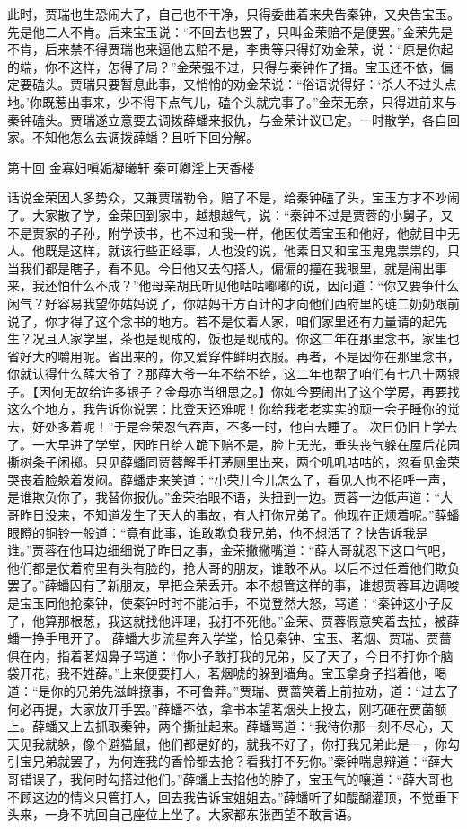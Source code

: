 \documentclass[12pt,oneside]{book}
\begin{document}
此时，贾瑞也生恐闹大了，自己也不干净，只得委曲着来央告秦钟，又央告宝玉。先是他二人不肯。后来宝玉说：“不回去也罢了，只叫金荣赔不是便罢。”金荣先是不肯，后来禁不得贾瑞也来逼他去赔不是，李贵等只得好劝金荣，说：“原是你起的端，你不这样，怎得了局？”金荣强不过，只得与秦钟作了揖。宝玉还不依，偏定要磕头。贾瑞只要暂息此事，又悄悄的劝金荣说：“俗语说得好：‘杀人不过头点地。’你既惹出事来，少不得下点气儿，磕个头就完事了。”金荣无奈，只得进前来与秦钟磕头。贾瑞遂立意要去调拨薛蟠来报仇，与金荣计议已定。一时散学，各自回家。不知他怎么去调拨薛蟠？且听下回分解。


 
第十回 金寡妇嗔姤凝曦轩 秦可卿淫上天香楼


话说金荣因人多势众，又兼贾瑞勒令，赔了不是，给秦钟磕了头，宝玉方才不吵闹了。大家散了学，金荣回到家中，越想越气，说：“秦钟不过是贾蓉的小舅子，又不是贾家的子孙，附学读书，也不过和我一样，他因仗着宝玉和他好，他就目中无人。他既是这样，就该行些正经事，人也没的说，他素日又和宝玉鬼鬼祟祟的，只当我们都是瞎子，看不见。今日他又去勾搭人，偏偏的撞在我眼里，就是闹出事来，我还怕什么不成？”他母亲胡氏听见他咕咕嘟嘟的说，因问道：“你又要争什么闲气？好容易我望你姑妈说了，你姑妈千方百计的才向他们西府里的琏二奶奶跟前说了，你才得了这个念书的地方。若不是仗着人家，咱们家里还有力量请的起先生？况且人家学里，茶也是现成的，饭也是现成的。你这二年在那里念书，家里也省好大的嚼用呢。省出来的，你又爱穿件鲜明衣服。再者，不是因你在那里念书，你就认得什么薛大爷了？那薛大爷一年不给不给，这二年也帮了咱们有七八十两银子。【因何无故给许多银子？金母亦当细思之。】你如今要闹出了这个学房，再要找这么个地方，我告诉你说罢：比登天还难呢！你给我老老实实的顽一会子睡你的觉去，好处多着呢！”于是金荣忍气吞声，不多一时，他自去睡了。
次日仍旧上学去了。一大早进了学堂，因昨日给人跪下赔不是，脸上无光，垂头丧气躲在屋后花园撕树条子闲掷。只见薛蟠同贾蓉解手打茅厕里出来，两个叽叽咕咕的，忽看见金荣哭丧着脸躲着发闷。薛蟠走来笑道：“小荣儿今儿怎么了，看见人也不招呼一声，是谁欺负你了，我替你报仇。”金荣抬眼不语，头扭到一边。贾蓉一边低声道：“大哥昨日没来，不知道发生了天大的事故，有人打你兄弟了。他现在正烦着呢。”薛蟠眼瞪的铜铃一般道：“竟有此事，谁敢欺负我兄弟，他不想活了？快告诉我是谁。”贾蓉在他耳边细细说了昨日之事，金荣撇撇嘴道：“薛大哥就忍下这口气吧，他们都是仗着府里有头有脸的，抢大哥的朋友，谁敢不从。以后不过任着他们欺负罢了。”薛蟠因有了新朋友，早把金荣丢开。本不想管这样的事，谁想贾蓉耳边调唆是宝玉同他抢秦钟，使秦钟时时不能沾手，不觉登然大怒，骂道：“秦钟这小子反了，他算那根葱，我这就找他评理，我打不死他。”金荣、贾蓉假意笑着去拉，被薛蟠一挣手甩开了。
薛蟠大步流星奔入学堂，恰见秦钟、宝玉、茗烟、贾瑞、贾蔷俱在内，指着茗烟鼻子骂道：“你小子敢打我的兄弟，反了天了，今日不打你个脑袋开花，我不姓薛。”上来便要打人，茗烟唬的躲到墙角。宝玉拿身子挡着他，喝道：“是你的兄弟先滋衅撩事，不可鲁莽。”贾瑞、贾蔷笑着上前拉劝，道：“过去了何必再提，大家放开手罢。”薛蟠不依，拿书本望茗烟头上投去，刚巧砸在贾菌额上。薛蟠又上去抓取秦钟，两个撕扯起来。薛蟠骂道：“我待你那一刻不尽心，天天见我就躲，像个避猫鼠，他们都是好的，就我不好了，你打我兄弟此是一，你勾引宝兄弟就罢了，为何连我的香怜都去抢？看我打不死你。”秦钟喘息辩道：“薛大哥错误了，我何时勾搭过他们。”薛蟠上去掐他的脖子，宝玉气的嚷道：“薛大哥也不顾这边的情义只管打人，回去我告诉宝姐姐去。”薛蟠听了如醍醐灌顶，不觉垂下头来，一身不吭回自己座位上坐了。大家都东张西望不敢言语。　
\end{document}
